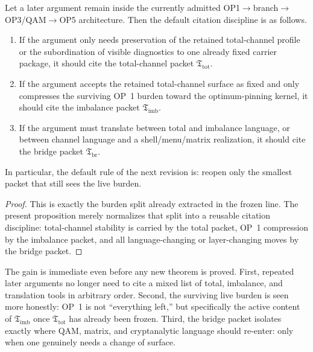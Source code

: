 \begin{proposition}
\label{prop:channel-sorted-citation-rule}
Let a later argument remain inside the currently admitted OP1$\to$branch$\to$OP3/QAM$\to$OP5 architecture. Then the default citation discipline is as follows.
\begin{enumerate}[leftmargin=2em]
 \item If the argument only needs preservation of the retained total-channel profile or the subordination of visible diagnostics to one already fixed carrier package, it should cite the total-channel packet \(\mathfrak T_{\mathrm{tot}}\).
 \item If the argument accepts the retained total-channel surface as fixed and only compresses the surviving OP~1 burden toward the optimum-pinning kernel, it should cite the imbalance packet \(\mathfrak T_{\mathrm{imb}}\).
 \item If the argument must translate between total and imbalance language, or between channel language and a shell/menu/matrix realization, it should cite the bridge packet \(\mathfrak T_{\mathrm{br}}\).
\end{enumerate}
In particular, the default rule of the next revision is: reopen only the smallest packet that still sees the live burden.
\end{proposition}

\begin{proof}
This is exactly the burden split already extracted in the frozen line. The present proposition merely normalizes that split into a reusable citation discipline: total-channel stability is carried by the total packet, OP~1 compression by the imbalance packet, and all language-changing or layer-changing moves by the bridge packet.
\end{proof}

\begin{remark}
\label{rem:normalized-ledger-gain}
The gain is immediate even before any new theorem is proved. First, repeated later arguments no longer need to cite a mixed list of total, imbalance, and translation tools in arbitrary order. Second, the surviving live burden is seen more honestly: OP~1 is not ``everything left,'' but specifically the active content of \(\mathfrak T_{\mathrm{imb}}\) once \(\mathfrak T_{\mathrm{tot}}\) has already been frozen. Third, the bridge packet isolates exactly where QAM, matrix, and cryptanalytic language should re-enter: only when one genuinely needs a change of surface.
\end{remark}

